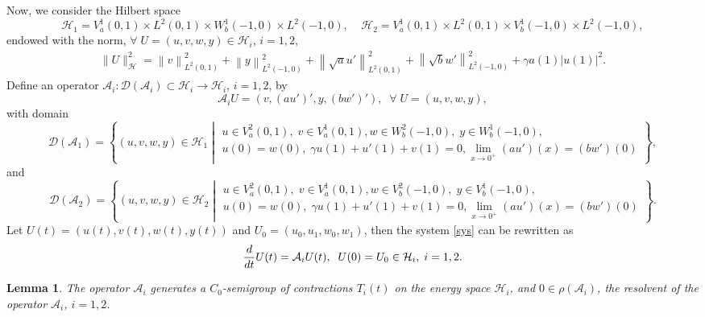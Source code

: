 \documentclass[twoside]{article}
\newtheorem{lemma}[definition]{Lemma}
\theoremstyle{noparens}
\theoremstyle{definition}
\numberwithin{equation}{section}
\numberwithin{figure}{section}
\begin{document}
Now, we consider the Hilbert space
$$\mathcal H_1 = V_a^1(0,1) \times L^2(0,1)\times W_{b}^1(-1,0) \times L^2(-1,0),\;\;\;\;
\mathcal H_2 = V_a^1(0,1) \times L^2(0,1)\times V_{b}^1(-1,0) \times L^2(-1,0),$$
endowed with the norm, $\forall\; U=(u,v,w,y)\in\mathcal H_i$, $i=1,2$,
\begin{equation*}
\begin{split}
	\|U\|_{\mathcal H}^2 = \left\|v\right\|_{L^2(0,1)}^2
	+ \left\|y\right\|_{L^2(-1,0)}^2
	+\left\|\sqrt{a}u'\right\|_{L^2(0,1)}^2
	+\left\|\sqrt{b}w'\right\|_{L^2(-1,0)}^2
	+ \gamma a(1)\left|u(1)\right|^2.
\end{split}
\end{equation*}
Define an operator $\mathcal A_i:\mathcal D(\mathcal A_i)\subset \mathcal H_i\rightarrow\mathcal H_i$, $i=1,2$, by
\begin{equation}\label{def}
\mathcal A_i U = (v,(au')',y,(bw')'),\;\;\forall\;U = (u,v,w,y),
\end{equation}
with domain
\begin{equation*}
\mathcal D(\mathcal A_1) = \left\{(u,v,w,y)\in \mathcal H_1\;\left|\;\begin{array}{l}
	u\in V_a^2(0,1),\;v\in V_a^1(0,1),
	w\in W_{b}^2(-1,0),\; y\in W_b^1(-1,0),\\
	u(0) = w(0),\;
	\gamma u(1) + u'(1) + v(1) = 0,
	\lim_{x\to  0^+} (au')(x) = (bw')(0)
\end{array}\right.\right\},
\end{equation*}
and
\begin{equation*}
\mathcal D(\mathcal A_2) = \left\{(u,v,w,y)\in \mathcal H_2\;\left|\;\begin{array}{l}
	u\in V_a^2(0,1),\;v\in V_a^1(0,1),
	w\in V_{b}^2(-1,0),\; y\in V_b^1(-1,0),\\
	u(0) = w(0),\;
	\gamma u(1) + u'(1) + v(1) = 0,
	\lim_{x\to  0^+} (au')(x) = (bw')(0)
\end{array}\right.\right\}.
\end{equation*}
Let $U(t) = (u(t),v(t),w(t),y(t))$ and $U_0= (u_0,u_1,w_0,w_1)$, then the system \eqref{sys} can be rewritten as
\begin{equation*}
{d\over dt}U(t) = \mathcal A_iU(t),\;\;U(0)=U_0\in\mathcal H_i,\;i=1,2.
\end{equation*}
\begin{lemma}
The operator $\mathcal A_i$ generates a $C_0$-semigroup of contractions $T_i(t)$ on the energy space $\mathcal H_i$, and $0\in\rho(\mathcal A_i)$, the resolvent of the operator $\mathcal A_i$, $i=1,2$.
\end{lemma}
\end{document}
